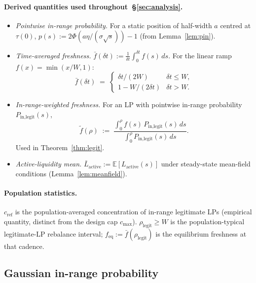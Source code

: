 \documentclass[11pt,a4paper]{article}
\theoremstyle{cgdefinition}
\theoremstyle{cgplain}
\theoremstyle{cgremark}
\begin{document}
\paragraph{Derived quantities used throughout~\S\ref{sec:analysis}.}
\begin{itemize}[leftmargin=2em]
\item \emph{Pointwise in-range probability.} For a static position of half-width $a$ centred at $\tau(0)$, $p(s) := 2\Phi(a\eta/(\sigma\sqrt{s})) - 1$ (from Lemma~\ref{lem:pin}).
\item \emph{Time-averaged freshness.} $\bar f(\delta t) := \frac{1}{\delta t}\int_0^{\delta t} f(s)\,ds$. For the linear ramp $f(x) = \min(x/W, 1)$:
\begin{equation}\label{eq:fbar}
\bar f(\delta t) \;=\; \begin{cases} \delta t/(2W) & \delta t \leq W, \\ 1 - W/(2\delta t) & \delta t > W. \end{cases}
\end{equation}
\item \emph{In-range-weighted freshness.} For an LP with pointwise in-range probability $P_{\text{in,legit}}(s)$,
\begin{equation}\label{eq:tildef}
\tilde f(\rho) \;:=\; \frac{\int_0^\rho f(s)\,P_{\text{in,legit}}(s)\,ds}{\int_0^\rho P_{\text{in,legit}}(s)\,ds}.
\end{equation}
Used in Theorem~\ref{thm:legit}.
\item \emph{Active-liquidity mean.} $\bar L_{\text{active}} := \mathbb{E}[L_{\text{active}}(s)]$ under steady-state mean-field conditions (Lemma~\ref{lem:meanfield}).
\end{itemize}

\paragraph{Population statistics.} $c_{\text{ref}}$ is the population-averaged concentration of in-range legitimate LPs (empirical quantity, distinct from the design cap $c_{\max}$). $\rho_{\text{legit}} \geq W$ is the population-typical legitimate-LP rebalance interval; $f_{\text{eq}} := \bar f(\rho_{\text{legit}})$ is the equilibrium freshness at that cadence.

\subsection{Gaussian in-range probability}\label{sec:pin-formula}
\end{document}
